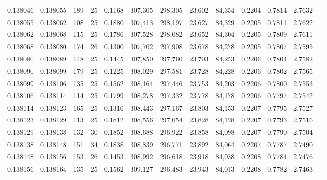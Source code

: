 \begin{tabular}{rrrrrrrrrrrrr}
0.138046 & 0.138055 &   189 &  25 &                                     0.1168 & 307,305 & 298,305 &  23,602 &  84,354 & 0.2204 & 0.7814 & 2.7632 \\
0.138055 & 0.138062 &   108 &  25 &                                     0.1880 & 307,413 & 298,197 &  23,627 &  84,329 & 0.2205 & 0.7811 & 2.7622 \\
0.138062 & 0.138068 &   115 &  25 &                                     0.1786 & 307,528 & 298,082 &  23,652 &  84,304 & 0.2205 & 0.7809 & 2.7611 \\
0.138068 & 0.138080 &   174 &  26 &                                     0.1300 & 307,702 & 297,908 &  23,678 &  84,278 & 0.2205 & 0.7807 & 2.7595 \\
0.138080 & 0.138089 &   148 &  25 &                                     0.1445 & 307,850 & 297,760 &  23,703 &  84,253 & 0.2206 & 0.7804 & 2.7582 \\
0.138090 & 0.138099 &   179 &  25 &                                     0.1225 & 308,029 & 297,581 &  23,728 &  84,228 & 0.2206 & 0.7802 & 2.7565 \\
0.138099 & 0.138106 &   135 &  25 &                                     0.1562 & 308,164 & 297,446 &  23,753 &  84,203 & 0.2206 & 0.7800 & 2.7553 \\
0.138106 & 0.138114 &   114 &  25 &                                     0.1799 & 308,278 & 297,332 &  23,778 &  84,178 & 0.2206 & 0.7797 & 2.7542 \\
0.138114 & 0.138123 &   165 &  25 &                                     0.1316 & 308,443 & 297,167 &  23,803 &  84,153 & 0.2207 & 0.7795 & 2.7527 \\
0.138123 & 0.138129 &   113 &  25 &                                     0.1812 & 308,556 & 297,054 &  23,828 &  84,128 & 0.2207 & 0.7793 & 2.7516 \\
0.138129 & 0.138138 &   132 &  30 &                                     0.1852 & 308,688 & 296,922 &  23,858 &  84,098 & 0.2207 & 0.7790 & 2.7504 \\
0.138138 & 0.138148 &   151 &  34 &                                     0.1838 & 308,839 & 296,771 &  23,892 &  84,064 & 0.2207 & 0.7787 & 2.7490 \\
0.138148 & 0.138156 &   153 &  26 &                                     0.1453 & 308,992 & 296,618 &  23,918 &  84,038 & 0.2208 & 0.7784 & 2.7476 \\
0.138156 & 0.138164 &   135 &  25 &                                     0.1562 & 309,127 & 296,483 &  23,943 &  84,013 & 0.2208 & 0.7782 & 2.7463 \\

\end{tabular}
